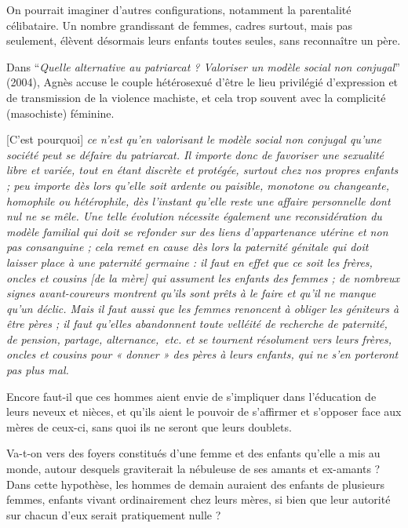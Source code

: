 On pourrait imaginer d'autres configurations, notamment la parentalité célibataire. Un nombre grandissant de femmes, cadres surtout, mais pas seulement, élèvent désormais leurs enfants toutes seules, sans reconnaître un père. 

Dans \enquote{\emph{Quelle alternative au patriarcat ? Valoriser un modèle social non conjugal}} (2004), Agnès  accuse le couple hétérosexué d'être le lieu privilégié d'expression et de transmission de la violence machiste, et cela trop souvent avec la complicité (masochiste) féminine. %

\begin{displayquote}
{[C'est pourquoi] \emph{ce n'est qu'en valorisant le modèle social non conjugal qu'une société peut se défaire du patriarcat. Il importe donc de favoriser une sexualité libre et variée, tout en étant discrète et protégée, surtout chez nos propres enfants ; peu importe dès lors qu'elle soit ardente ou paisible, monotone ou changeante, homophile ou hétérophile, dès l'instant qu'elle reste une affaire personnelle dont nul ne se mêle. Une telle évolution nécessite également une reconsidération du modèle familial qui doit se refonder sur des liens d'appartenance utérine et non pas consanguine ; cela remet en cause dès lors la paternité génitale qui doit laisser place à une paternité germaine : il faut en effet que ce soit les frères, oncles et cousins \emph{[de la mère]} qui assument les enfants des femmes ; de nombreux signes avant-coureurs montrent qu'ils sont prêts à le faire et qu'il ne manque qu'un déclic. Mais il faut aussi que les femmes renoncent à obliger les géniteurs à être pères ; il faut qu'elles abandonnent toute velléité de recherche de paternité, de pension, partage, alternance,~etc. et se tournent résolument vers leurs frères, oncles et cousins pour « donner » des pères à leurs enfants, qui ne s'en porteront pas plus mal.}}
\end{displayquote}

 Encore faut-il que ces hommes aient envie de s'impliquer dans l'éducation de leurs neveux et nièces, et qu'ils aient le pouvoir de s'affirmer et s'opposer face aux mères de ceux-ci, sans quoi ils ne seront que leurs doublets. 
 
 
 Va-t-on vers des foyers constitués d'une femme et des enfants qu'elle a mis au monde, autour desquels graviterait la nébuleuse de ses amants et ex-amants ? Dans cette hypothèse, les hommes de demain auraient des enfants de plusieurs femmes, enfants vivant ordinairement chez leurs mères, si bien que leur autorité sur chacun d'eux serait pratiquement nulle ? 
 
